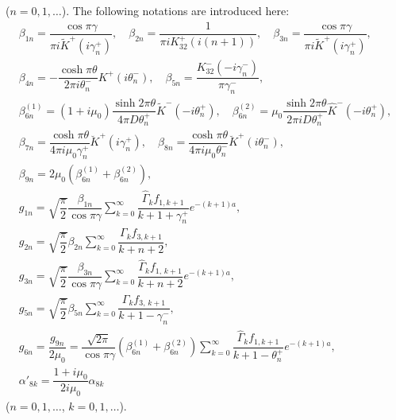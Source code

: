 ($n=0,1,\dots$). 
The following notations are introduced here:
\begin{equation} \label{Ostryk_Eq_33_} 
\begin{array}{l}
	\beta _{1n} =\dfrac{\cos \pi \gamma }{\pi i\tilde{K}^{+} (i\gamma _{n}^{+} )} , \quad   \beta _{2n} =\dfrac{1}{\pi iK_{32}^{+} (i(n+1))} ,\quad    \beta _{3n} =\dfrac{\cos \pi \gamma }{\pi i\tilde{K}^{+} (i\gamma _{n}^{+} )} ,
	\\
	\beta _{4n} =-\dfrac{\cosh \pi \theta }{2\pi i\theta _{n}^{-} } K^{+} (i\theta _{n}^{-} ),\quad    \beta _{5n} =\dfrac{K_{32}^{-} (-i\gamma _{n}^{-} )}{\pi \gamma _{n}^{-} } ,
	\\
	\beta _{6n}^{(1)} =(1+i\mu _{0} )\dfrac{\sinh 2\pi \theta }{4\pi D\theta _{n}^{+} } \tilde{K}^{-} (-i\theta _{n}^{+} ), \quad   \beta _{6n}^{(2)} =\mu _{0} \dfrac{\sinh 2\pi \theta }{2\pi iD\theta _{n}^{+} } \hat{K}^{-} (-i\theta _{n}^{+} ),
	\\
	\beta _{7n} =\dfrac{\cosh \pi \theta }{4\pi i\mu _{0} \gamma _{n}^{+} } \breve{K}^{+} (i\gamma _{n}^{+} ),\quad    \beta _{8n} =\dfrac{\cosh \pi \theta }{4\pi i\mu _{0} \theta _{n}^{-} } \breve{K}^{+} (i\theta _{n}^{-} ),   
	\\
	\beta _{9n} =2\mu _{0} \left(\beta _{6n}^{(1)} +\beta _{6n}^{(2)} \right),
	\\
	g_{1n} =\sqrt{\dfrac{\pi }{2} } \dfrac{\beta _{1n} }{\cos \pi \gamma } \displaystyle\sum _{k=0}^{\infty }\dfrac{\hat{\Gamma }_{k} f_{1, k+1} }{k+1+\gamma _{n}^{+} } e^{-(k+1)a} , 
	\\
	g_{2n} =\sqrt{\dfrac{\pi }{2} }  \beta _{2n}  \displaystyle\sum _{k=0}^{\infty }\dfrac{\Gamma _{k} f_{3, k+1} }{k+n+2}  ,
	\\
	g_{3n} =\sqrt{\dfrac{\pi }{2} } \dfrac{\beta _{3n} }{\cos \pi \gamma } \sum _{k=0}^{\infty }\dfrac{\hat{\Gamma }_{k} f_{1,\, k+1} }{k+n+2} e^{-(k+1)a} ,
	\\
	g_{5n} =\sqrt{\dfrac{\pi }{2} } \beta _{5n} \displaystyle\sum _{k=0}^{\infty }\dfrac{\Gamma _{k} f_{3,\, k+1} }{k+1-\gamma _{n}^{-} } ,
	\\
	g_{6n} =\dfrac{g_{9n} }{2\mu _{0} } =\dfrac{\sqrt{2\pi } }{\cos \pi \gamma } \left(\beta _{6n}^{(1)} +\beta _{6n}^{(2)} \right)\displaystyle\sum _{k=0}^{\infty }\dfrac{\hat{\Gamma }_{k} f_{1,k+1} }{k+1-\theta _{n}^{+} } e^{-(k+1)a},
	\\
	\alpha '_{8k} =\dfrac{1+i\mu _{0} }{2i\mu _{0} } \alpha _{8k} 
\end{array}
\end{equation} 
($n=0,1,\dots$, $k=0,1,\dots$).

